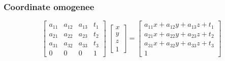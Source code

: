 \begin{frame}
\frametitle{Coordinate omogenee}
\begin{displaymath}
\begin{bmatrix}
a_{11} & a_{12} & a_{13} & t_1 \\
a_{21} & a_{22} & a_{23} & t_2 \\
a_{31} & a_{32} & a_{33} & t_3 \\
0      &    0   &  0     & 1 
\end{bmatrix}
~\begin{bmatrix}
x \\ y\\ z\\ 1
\end{bmatrix}
=  
\begin{bmatrix}
a_{11}x + a_{12}y + a_{13}z + t_1 \\
a_{21}x + a_{22}y + a_{23}z + t_2 \\
a_{31}x + a_{32}y + a_{33}z + t_3 \\
 1
\end{bmatrix}
\end{displaymath}
\end{frame}

